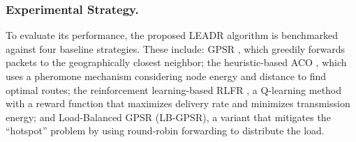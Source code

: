 \documentclass[runningheads]{llncs}
\begin{document}
\subsubsection{Experimental Strategy.} 
To evaluate its performance, the proposed LEADR algorithm is benchmarked against four baseline strategies. These include: GPSR \cite{gpsr}, which greedily forwards packets to the geographically closest neighbor; the heuristic-based ACO \cite{aco}, which uses a pheromone mechanism considering node energy and distance to find optimal routes; the reinforcement learning-based RLFR \cite{DRLFR}, a Q-learning method with a reward function that maximizes delivery rate and minimizes transmission energy; and Load-Balanced GPSR (LB-GPSR), a variant that mitigates the ``hotspot'' problem by using round-robin forwarding to distribute the load.
\end{document}
